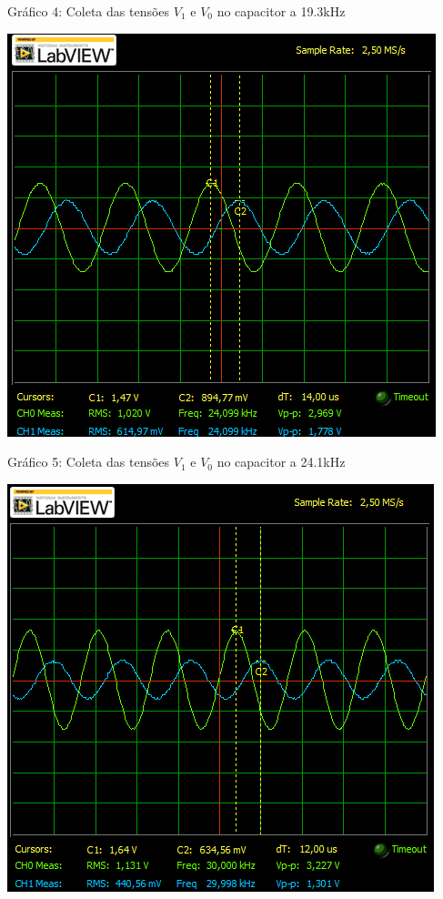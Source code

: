 \documentclass[a4 paper]{article}
\begin{document}
\begin{center}
Gráfico 4: Coleta das tensões $V_1$ e $V_0$ no capacitor a 19.3kHz
\end{center}

\newpage
\begin{table}[h]
\centering
\includegraphics[scale=0.7]{graficos/circ1/rgadicoa1-2-24_1}
\end{table}

\begin{center}
Gráfico 5: Coleta das tensões $V_1$ e $V_0$ no capacitor a 24.1kHz
\end{center}


\begin{table}[h]
\centering
\includegraphics[scale=0.7]{graficos/circ1/rgadicoa1-2-30}
\end{table}
\end{document}
